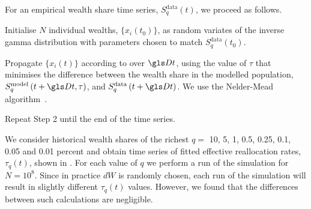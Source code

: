 For an empirical wealth share time series, $S^{\text{data}}_q\left(t\right)$, we proceed as follows.

\bi
\item[ -- Step 1]
Initialise $N$ individual wealths, $\{x_i\left(t_0\right)\}$, as random variates of the inverse gamma distribution with parameters chosen to match $S^{\text{data}}_q\left(t_0\right)$.
\item[ -- Step 2]
Propagate $\{x_i\left(t\right)\}$ according to  over $\Dt$,
using the value of $\tau$ that minimises the difference between the wealth share in the modelled population, $S^{\text{model}}_q\left(t+\Dt, \tau\right)$, and $S^{\text{data}}_q\left(t+\Dt\right)$. We use the Nelder-Mead algorithm~\cite{NelderMead1965}.
\item[ -- Step 3]
Repeat Step 2 until the end of the time series.
\ei

We consider historical wealth shares of the richest $q=$ 10, 5, 1, 0.5, 0.25, 0.1, 0.05 and 0.01 percent and obtain time series of fitted effective reallocation rates, $\tau_q\left(t\right)$, shown in .
For each value of $q$ we perform a run of the simulation for $N=10^8$. Since in practice $dW$ is randomly chosen, each run of the simulation will result in slightly different $\tau_q\left(t\right)$ values. However, we found that the differences between such calculations are negligible. 

